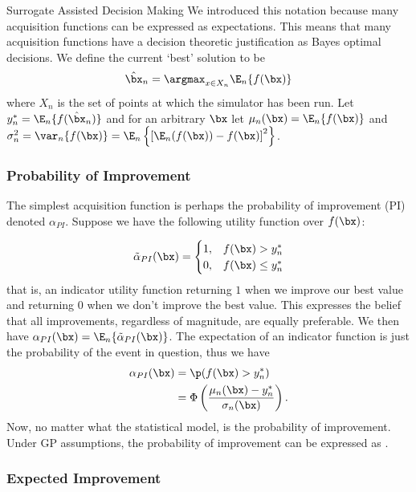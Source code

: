 \begin{chapter}{Surrogate Assisted Decision Making \label{Chap:optimisation}}
We introduced this notation because many acquisition functions can be expressed as expectations. This means that many acquisition functions have a decision theoretic justification as Bayes optimal decisions. We define the current `best' solution to be
\begin{equation}
  \hat{\bx}_n = \argmax_{x \in X_n} \E_n \{ f(\bx) \}
\end{equation}
where $X_n$ is the set of points at which the simulator has been run. Let $y^{*}_n = \E_n \{ f(\hat{\bx}_n) \}$ and for an arbitrary $\bx$ let $\mu_n(\bx) = \E_n \{ f(\bx) \}$ and $\sigma^2_n = \var_n\{ f(\bx) \} = \E_n \left\{  \left[ \E_n(f(\bx)) - f(\bx)\right]^2  \right\} $.
\subsubsection{Probability of Improvement}

The simplest acquisition function is perhaps the probability of improvement (PI) denoted $\alpha_{PI}$. Suppose we have the following utility function over $f(\bx)$:

\begin{equation}
  \tilde{\alpha}_{PI}(\bx) =
  \begin{cases}
    1,& f(\bx) > y^{*}_n \\
    0,& f(\bx) \leq y^{*}_n
  \end{cases}
\end{equation}
that is, an indicator utility function returning $1$ when we improve our best value and returning $0$ when we don't improve the best value. This expresses the belief that all improvements, regardless of magnitude, are equally preferable. We then have $\alpha_{PI}(\bx)  = \E_n \{ \tilde{\alpha}_{PI}(\bx) \}$. The expectation of an indicator function is just the probability of the event in question, thus we have
\begin{align}
  \alpha_{PI}(\bx) &= \p(f(\bx) > y^{*}_n)\label{Eq:prob-imp}\\
   &= \Phi\left(\frac{ \mu_{n}(\bx)  - y^{*}_n }{\sigma_{n}(\bx)}\right). \label{Eq:prob-imp-gp}
\end{align}
Now, no matter what the statistical model,  is the probability of improvement. Under GP assumptions, the probability of improvement can be expressed as .

\subsubsection{Expected Improvement}


\end{chapter}
